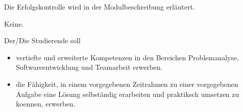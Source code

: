 \begin{course}

\setdoclanguagegerman
{}



\coursehead


\label{cour_7491.dp_997}


\begin{styleenv}
\begin{assessment}
Die Erfolgskontrolle wird in der Modulbeschreibung erläutert.


\end{assessment}

\begin{conditions}Keine.\end{conditions}


\end{styleenv}

\begin{learningoutcomes}
Der/Die Studierende soll

 \begin{itemize}\item vertiefte und erweiterte Kompetenzen in den Bereichen Problemanalyse, Softwareentwicklung und Teamarbeit erwerben.  \item die Fähigkeit, in einem vorgegebenen Zeitrahmen zu einer vorgegebenen Aufgabe eine Lösung selbständig erarbeiten und praktiksch umsetzen zu koennen, erwerben.  \end{itemize}
\end{learningoutcomes}


\end{course}
